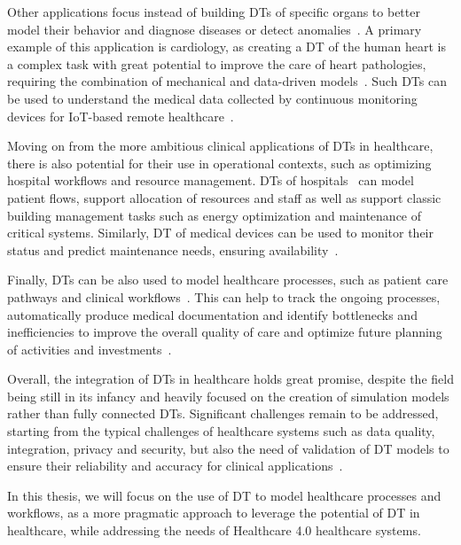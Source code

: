 Other applications focus instead of building \acp{DT} of specific organs to better model their behavior and diagnose diseases or detect anomalies~\cite{Erol_Mendi_Doğan_2020}. A primary example of this application is cardiology, as creating a \ac{DT} of the human heart is a complex task with great potential to improve the care of heart pathologies, requiring the combination of mechanical and data-driven models~\cite{Corral-Acero_Margara_Marciniak_Rodero_Loncaric_Feng_Gilbert_Fernandes_Bukhari_Wajdan_et_al._2020}.
%
Such \acp{DT} can be used to understand the medical data collected by continuous monitoring devices for \ac{IoT}-based remote healthcare~\cite{Elayan_Aloqaily_Guizani_2021}.

Moving on from the more ambitious clinical applications of \acp{DT} in healthcare, there is also potential for their use in operational contexts, such as optimizing hospital workflows and resource management.
%
\acp{DT} of hospitals~\cite{Peng_Zhang_Yu_Xu_Gao_2020} can model patient flows, support allocation of resources and staff as well as support classic building management tasks such as energy optimization and maintenance of critical systems. 
%
Similarly, \ac{DT} of medical devices can be used to monitor their status and predict maintenance needs, ensuring availability~\cite{Peng_Zhang_Yu_Xu_Gao_2020}.

Finally, \acp{DT} can be also used to model healthcare processes, such as patient care pathways and clinical workflows~\cite{Ricci_Croatti_Montagna_2022}.
%
This can help to track the ongoing processes, automatically produce medical documentation and identify bottlenecks and inefficiencies to improve the overall quality of care and optimize future planning of activities and investments~\cite{Ricci_Croatti_Montagna_2022}.

Overall, the integration of \acp{DT} in healthcare holds great promise, despite the field being still in its infancy and heavily focused on the creation of simulation models rather than fully connected \acp{DT}. 
%
Significant challenges remain to be addressed, starting from the typical challenges of healthcare systems such as data quality, integration, privacy and security, but also the need of validation of \ac{DT} models to ensure their reliability and accuracy for clinical applications~\cite{Katsoulakis_Wang_Wu_Shahriyari_Fletcher_Liu_Achenie_Liu_Jackson_Xiao_et_al._2024}.

In this thesis, we will focus on the use of \ac{DT} to model healthcare processes and workflows, as a more pragmatic approach to leverage the potential of \ac{DT} in healthcare, while addressing the needs of Healthcare 4.0 healthcare systems.


